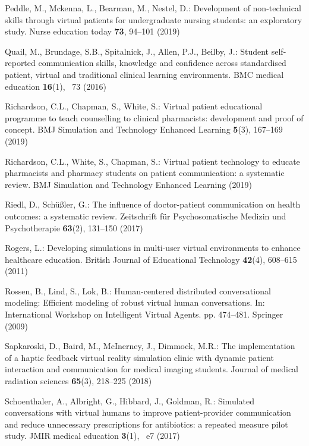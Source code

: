 \documentclass[runningheads]{llncs}
\begin{document}
\begin{thebibliography}{10}
Peddle, M., Mckenna, L., Bearman, M., Nestel, D.: Development of non-technical
  skills through virtual patients for undergraduate nursing students: an
  exploratory study. Nurse education today  \textbf{73},  94--101 (2019)

Quail, M., Brundage, S.B., Spitalnick, J., Allen, P.J., Beilby, J.: Student
  self-reported communication skills, knowledge and confidence across
  standardised patient, virtual and traditional clinical learning environments.
  BMC medical education  \textbf{16}(1), ~73 (2016)

Richardson, C.L., Chapman, S., White, S.: Virtual patient educational programme
  to teach counselling to clinical pharmacists: development and proof of
  concept. BMJ Simulation and Technology Enhanced Learning  \textbf{5}(3),
  167--169 (2019)

Richardson, C.L., White, S., Chapman, S.: Virtual patient technology to educate
  pharmacists and pharmacy students on patient communication: a systematic
  review. BMJ Simulation and Technology Enhanced Learning  (2019)

Riedl, D., Sch{\"u}{\ss}ler, G.: The influence of doctor-patient communication
  on health outcomes: a systematic review. Zeitschrift f{\"u}r Psychosomatische
  Medizin und Psychotherapie  \textbf{63}(2),  131--150 (2017)

Rogers, L.: Developing simulations in multi-user virtual environments to
  enhance healthcare education. British Journal of Educational Technology
  \textbf{42}(4),  608--615 (2011)

Rossen, B., Lind, S., Lok, B.: Human-centered distributed conversational
  modeling: Efficient modeling of robust virtual human conversations. In:
  International Workshop on Intelligent Virtual Agents. pp. 474--481. Springer
  (2009)

Sapkaroski, D., Baird, M., McInerney, J., Dimmock, M.R.: The implementation of
  a haptic feedback virtual reality simulation clinic with dynamic patient
  interaction and communication for medical imaging students. Journal of
  medical radiation sciences  \textbf{65}(3),  218--225 (2018)

Schoenthaler, A., Albright, G., Hibbard, J., Goldman, R.: Simulated
  conversations with virtual humans to improve patient-provider communication
  and reduce unnecessary prescriptions for antibiotics: a repeated measure
  pilot study. JMIR medical education  \textbf{3}(1), ~e7 (2017)


\end{thebibliography}
\end{document}
